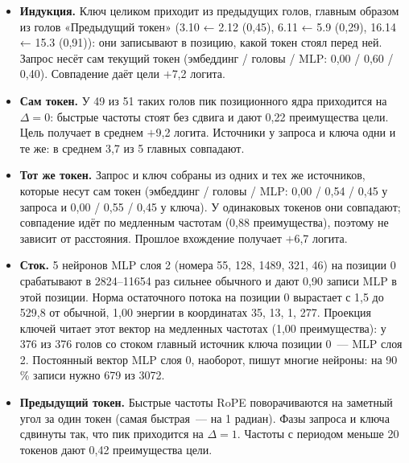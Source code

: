 \documentclass[10pt]{article}
\begin{document}
\begin{itemize}
\item \textbf{Индукция.} Ключ целиком приходит из предыдущих голов, главным образом из голов «Предыдущий токен» (3.10 ← 2.12 (0,45), 6.11 ← 5.9 (0,29), 16.14 ← 15.3 (0,91)): они записывают в позицию, какой токен стоял перед ней. Запрос несёт сам текущий токен (эмбеддинг / головы / MLP: 0,00 / 0,60 / 0,40). Совпадение даёт цели $+$7,2 логита.
\item \textbf{Сам токен.} У 49 из 51 таких голов пик позиционного ядра приходится на $\Delta{=}0$: быстрые частоты стоят без сдвига и дают 0,22 преимущества цели. Цель получает в среднем $+$9,2 логита. Источники у запроса и ключа одни и те же: в среднем 3,7 из 5 главных совпадают.
\item \textbf{Тот же токен.} Запрос и ключ собраны из одних и тех же источников, которые несут сам токен (эмбеддинг / головы / MLP: 0,00 / 0,54 / 0,45 у запроса и 0,00 / 0,55 / 0,45 у ключа). У одинаковых токенов они совпадают; совпадение идёт по медленным частотам (0,88 преимущества), поэтому не зависит от расстояния. Прошлое вхождение получает $+$6,7 логита.
\item \textbf{Сток.} 5 нейронов MLP слоя 2 (номера 55, 128, 1489, 321, 46) на позиции 0 срабатывают в 2824–11654 раз сильнее обычного и дают 0,90 записи MLP в этой позиции. Норма остаточного потока на позиции 0 вырастает с 1,5 до 529,8 от обычной, 1,00 энергии в координатах 35, 13, 1, 277. Проекция ключей читает этот вектор на медленных частотах (1,00 преимущества): у 376 из 376 голов со стоком главный источник ключа позиции 0~— MLP слоя 2. Постоянный вектор MLP слоя 0, наоборот, пишут многие нейроны: на 90\,\% записи нужно 679 из 3072.
\end{itemize}
\begin{itemize}
\item \textbf{Предыдущий токен.} Быстрые частоты RoPE поворачиваются на заметный угол за один токен (самая быстрая~— на 1 радиан). Фазы запроса и ключа сдвинуты так, что пик приходится на $\Delta{=}1$. Частоты с периодом меньше 20 токенов дают 0,42 преимущества цели.
\end{itemize}
\end{document}
